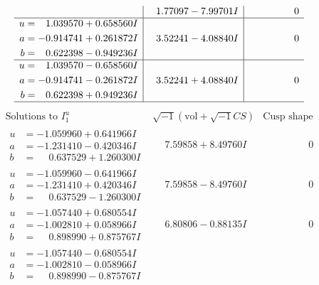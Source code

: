 \documentclass[1p]{elsarticle_modified}
\theoremstyle{definition}
\newcommand{\I}{\sqrt{-1}}
\begin{document}
$$\begin{array}{c|c|c}
 & \phantom{-}1.77097 - 7.99701 I & \phantom{-0.000000 } 0 \\ \hline\begin{aligned}
u &= \phantom{-}1.039570 + 0.658560 I \\
a &= -0.914741 + 0.261872 I \\
b &= \phantom{-}0.622398 - 0.949236 I\end{aligned}
 & \phantom{-}3.52241 - 4.08840 I & \phantom{-0.000000 } 0 \\ \hline\begin{aligned}
u &= \phantom{-}1.039570 - 0.658560 I \\
a &= -0.914741 - 0.261872 I \\
b &= \phantom{-}0.622398 + 0.949236 I\end{aligned}
 & \phantom{-}3.52241 + 4.08840 I & \phantom{-0.000000 } 0\\
 \hline 
 \end{array}$$\newpage$$\begin{array}{c|c|c}  
\text{Solutions to }I^u_{1}& \I (\text{vol} + \sqrt{-1}CS) & \text{Cusp shape}\\
 \hline 
\begin{aligned}
u &= -1.059960 + 0.641966 I \\
a &= -1.231410 - 0.420346 I \\
b &= \phantom{-}0.637529 + 1.260300 I\end{aligned}
 & \phantom{-}7.59858 + 8.49760 I & \phantom{-0.000000 } 0 \\ \hline\begin{aligned}
u &= -1.059960 - 0.641966 I \\
a &= -1.231410 + 0.420346 I \\
b &= \phantom{-}0.637529 - 1.260300 I\end{aligned}
 & \phantom{-}7.59858 - 8.49760 I & \phantom{-0.000000 } 0 \\ \hline\begin{aligned}
u &= -1.057440 + 0.680554 I \\
a &= -1.002810 + 0.058966 I \\
b &= \phantom{-}0.898990 + 0.875767 I\end{aligned}
 & \phantom{-}6.80806 - 0.88135 I & \phantom{-0.000000 } 0 \\ \hline\begin{aligned}
u &= -1.057440 - 0.680554 I \\
a &= -1.002810 - 0.058966 I \\
b &= \phantom{-}0.898990 - 0.875767 I\end{aligned}

\end{array}$$
\end{document}
